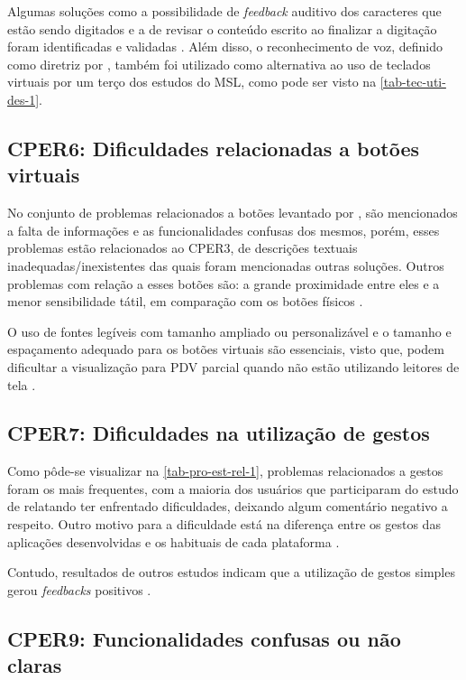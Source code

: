 Algumas soluções como a possibilidade de \emph{feedback} auditivo dos caracteres que estão sendo digitados e
a de revisar o conteúdo escrito ao finalizar a digitação foram identificadas e validadas \cite{Siebra2016, Duarte2017}.
Além disso, o reconhecimento de voz, definido como diretriz por , também foi
utilizado como alternativa ao uso de teclados virtuais por um terço dos estudos do MSL\@, como pode ser visto na \autoref{tab-tec-uti-des-1}.

\subsection{CPER6: Dificuldades relacionadas a botões virtuais}

No conjunto de problemas relacionados a botões levantado por , são mencionados a falta de informações
e as funcionalidades confusas dos mesmos, porém, esses problemas estão relacionados ao CPER3, de descrições textuais
inadequadas/inexistentes das quais foram mencionadas outras soluções. Outros problemas com relação a esses botões são:
a grande proximidade entre eles e a menor sensibilidade tátil, em comparação com os botões físicos \cite{Damaceno2016}.

O uso de fontes legíveis com tamanho ampliado ou personalizável e o tamanho e espaçamento adequado para os botões virtuais
são essenciais, visto que, podem dificultar a visualização para PDV parcial quando não estão utilizando leitores
de tela \cite{Heesook2017,Kim20191103}.

\subsection{CPER7: Dificuldades na utilização de gestos}

Como pôde-se visualizar na \autoref{tab-pro-est-rel-1}, problemas relacionados a gestos foram os mais frequentes, com a maioria dos usuários
que participaram do estudo de  relatando ter enfrentado dificuldades, deixando algum comentário negativo a respeito.
Outro motivo para a dificuldade está na diferença entre os gestos das aplicações desenvolvidas e os habituais de cada plataforma \cite{Leporini2017}.

Contudo, resultados de outros estudos indicam que a utilização de gestos simples gerou \emph{feedbacks} positivos \cite{Duarte2017,Ducci2018}.

\subsection{CPER9: Funcionalidades confusas ou não claras}

